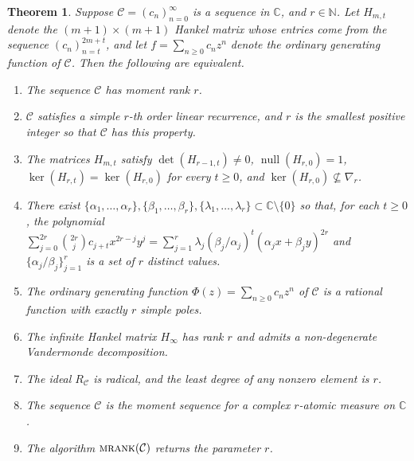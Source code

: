 \documentclass[12pt,reqno]{article}
\newtheorem{theorem}{Theorem}
\newcommand{\cC}{\mathcal{C}}
\newcommand{\malg}{\textsc{mrank}}
\DeclareMathOperator{\nul}{null}
\begin{document}
\begin{theorem}\label{Thm:TFAEforGDC}
Suppose $\mathcal{C} = (c_n)_{n=0}^\infty$ is a sequence in $\mathbb{C}$, and $r \in \mathbb{N}$. Let $H_{m,t}$ denote the $(m+1)\times(m+1)$ Hankel matrix whose entries come from the sequence $(c_n)_{n=t}^{2m+t}$, and let $f = \sum_{n \geq 0} c_n z^n$ denote the ordinary generating function of $\mathcal{C}$. Then the following are equivalent. 
\begin{enumerate}
\item The sequence $\mathcal{C}$ has moment rank $r$. 
\item $\mathcal{C}$ satisfies a simple $r$-th order linear recurrence, and $r$ is the smallest positive integer so that $\mathcal{C}$ has this property.
\item The matrices $H_{m,t}$ satisfy $\det(H_{r-1,t})\neq 0$, $\nul(H_{r,0}) = 1$, $\ker(H_{r,t}) = \ker(H_{r,0})$ for every $t \geq 0$, and $\ker(H_{r,0})\not\subseteq \nabla_r$.
\item There exist $\{\alpha_1,\ldots,\alpha_r\}, \{\beta_1,\ldots,\beta_r\}, \{\lambda_1,\ldots,\lambda_r\} \subset \mathbb{C} \setminus \{0\}$ so that, for each $t \geq 0$, the polynomial $\sum_{j=0}^{2r} \binom{2r}{j} c_{j+t} x^{2r-j} y^{j} = \sum_{j=1}^r \lambda_j (\beta_j/\alpha_j)^t (\alpha_j x + \beta_j y)^{2r}$ and $\{\alpha_j/\beta_j\}_{j=1}^r$ is a set of $r$ distinct values.
\item The ordinary generating function $\Phi(z) = \sum_{n \geq 0} c_n z^n$ of $\mathcal{C}$ is a rational function with exactly $r$ simple poles.
\item The infinite Hankel matrix $H_\infty$ has rank $r$ and admits a non-degenerate Vandermonde decomposition. 
\item The ideal $R_{\mathcal{C}}$ is radical, and the least degree of any nonzero element is $r$.
\item The sequence $\cC$ is the moment sequence for a complex $r$-atomic measure on $\mathbb{C}$. 
\item The algorithm $\malg(\mathcal{C})$ returns the parameter $r$.
\end{enumerate}
\end{theorem}
\end{document}
